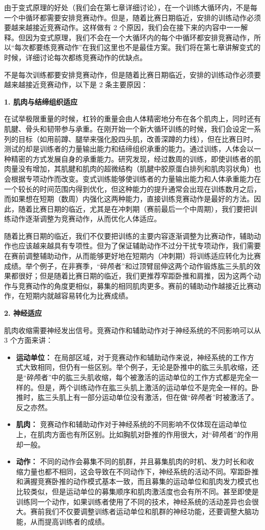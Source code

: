\documentclass[fontset=fandol, a4paper, 12pt, openright]{ctexbook}
\begin{document}
由于变式原理的好处（我们会在第七章详细讨论），在一个训练大循环内，不是每一个中循环都需要安排竞赛动作。但是，随着比赛日期临近，安排的训练动作必须要越来越接近竞赛动作。这样做有 2 个原因，我们会在接下来的内容中一一解释。但因为变式原理，我们不会在一个大循环内的每个中循环都安排竞赛动作，所以“每次都要练竞赛动作”在我们这里也不是最佳方案。我们将在第七章讲解变式的时候，详细讨论每次都练竞赛动作的优缺点。

不是每次训练都要安排竞赛动作，但是随着比赛日期临近，安排的训练动作必须要越来越接近竞赛动作，以下是 2 条主要原因：

\textbf{1. 肌肉与结缔组织适应}

在试举极限重量的时候，杠铃的重量会由人体精密地分布在各个肌肉上，同时还有肌腱、骨头和韧带参与承重。在刚开始一个新大循环训练的时候，我们会设定一系列的目标（如用前蹲、腿举来强化股四头肌，改善深蹲的力线），但在比赛日时，测试的却是训练者的力量输出能力和结缔组织承重的能力。通过训练，人体会以一种精密的方式发展自身的承重能力。研究发现，经过数周的训练，即使训练者的肌肉量没有增加，其肌腱和肌肉的超微结构（肌腱中胶原蛋白排列和肌肉羽状角）也会根据专项动作而改变。变式训练能够使训练者的力量输出能力和人体承重能力在一个较长的时间范围内得到优化，但这种能力的提升通常会出现在训练数月之后，而如果想在短期（数周）内强化这两种能力，直接训练竞赛动作是最好的方法。因此，随着比赛日期的临近，尤其是在冲刺期（赛前最后一个中周期），我们要把训练动作逐渐调整为竞赛动作，从而优化人体适应。

随着比赛日期的临近，我们不仅要把训练的主要内容逐渐调整为比赛动作，辅助动作也应该越来越具有专项性。但为了保证辅助动作不过分干扰专项动作，我们需要在赛前调整辅助动作，从而能够更好地在短期内（冲刺期）将训练适应转化为比赛成绩。举个例子，在非赛季，“碎颅者”和过顶臂屈伸这两个动作锻炼肱三头肌的效果都很好；但是随着比赛日期的临近，我们更推荐窄距卧推和肩推，因为这两个动作与竞赛动作的角度更相似，募集的相同肌肉更多。赛前的辅助动作越接近比赛动作，在短期内就越容易转化为比赛成绩。

\textbf{2. 神经适应}

肌肉收缩需要神经发出信号。竞赛动作和辅助动作对于神经系统的不同影响可以从 3 个方面来讲：
\begin{itemize}
    \item \textbf{运动单位：} 在局部区域，对于竞赛动作和辅助动作来说，神经系统的工作方式大致相同，但仍有一些区别。举个例子，无论是卧推中的肱三头肌收缩，还是“碎颅者”中的肱三头肌收缩，每个被激活的运动单位的工作方式都是完全一样的。但是，两个训练动作在肱三头肌上激活的运动单位不是完全一样的。卧推时，肱三头肌上有一部分运动单位没有激活，但在做“碎颅者”时被激活了。反之亦然。
    \item \textbf{肌肉：} 竞赛动作和辅助动作对于神经系统的不同影响不仅体现在运动单位上，在肌肉方面也有所区别。比如胸肌对卧推的作用很大，对“碎颅者”的作用却一般。
    \item \textbf{动作：} 不同的动作会募集不同的肌群，并且募集肌肉的时机、发力时长和收缩力量也都不相同，这会导致在不同动作下，神经系统的活动不同。窄距卧推和满握竞赛卧推的动作模式基本一致，而且募集的运动单位和肌肉发力模式也比较类似，但是运动单位的募集顺序和肌肉激活度也会有所不同。甚至即使是训练同一个动作，如果训练者使用了不同的技术，神经系统的活动差异也会很大。赛前我们不仅要调整训练者运动单位和肌群的神经功能，还要调整大脑功能，从而提高训练者的成绩。
\end{itemize}
\end{document}

